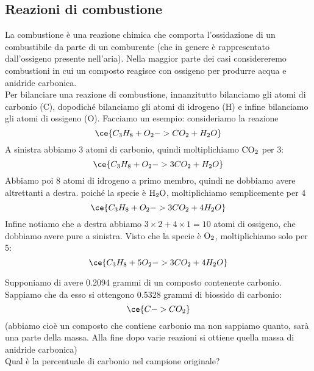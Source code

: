 \subsection{Reazioni di combustione}
La combustione è una reazione chimica che comporta l'ossidazione di un combustibile da parte di un comburente (che in genere è rappresentato dall'ossigeno presente nell'aria). Nella maggior parte dei casi considereremo combustioni in cui un composto reagisce con ossigeno per produrre acqua e anidride carbonica.\\
Per bilanciare una reazione di combustione, innanzitutto bilanciamo gli atomi di carbonio (C), dopodiché bilanciamo gli atomi di idrogeno (H) e infine bilanciamo gli atomi di ossigeno (O). Facciamo un esempio: consideriamo la reazione
\begin{equation*}
    \ce{C_3H_8 + O_2 -> CO_2 + H_2O}
\end{equation*}
A sinistra abbiamo 3 atomi di carbonio, quindi moltiplichiamo $\rm CO_2$ per 3:
\begin{equation*}
    \ce{C_3H_8 + O_2 -> 3CO_2 + H_2O}
\end{equation*}
Abbiamo poi 8 atomi di idrogeno a primo membro, quindi ne dobbiamo avere altrettanti a destra. poiché la specie è $\rm H_2O$, moltiplichiamo semplicemente per 4
\begin{equation*}
    \ce{C_3H_8 + O_2 -> 3CO_2 + 4H_2O}
\end{equation*}
Infine notiamo che a destra abbiamo $3 \times 2 + 4 \times 1=10$ atomi di ossigeno, che dobbiamo avere pure a sinistra. Visto che la specie è $\rm O_2$, moltiplichiamo solo per 5:
\begin{equation*}
    \ce{C_3H_8 + 5O_2 -> 3CO_2 + 4H_2O}
\end{equation*}
\newpage
\begin{esercizio}[$\bigstar$]
    Supponiamo di avere 0.2094 grammi di un composto contenente carbonio. Sappiamo che da esso si ottengono 0.5328 grammi di biossido di carbonio:
    \begin{equation*}
        \ce{C -> CO_2}
    \end{equation*}
    (abbiamo cioè un composto che contiene carbonio ma non sappiamo quanto, sarà una parte della massa. Alla fine dopo varie reazioni si ottiene quella massa di anidride carbonica)\\
    Qual è la percentuale di carbonio nel campione originale?
\end{esercizio}
